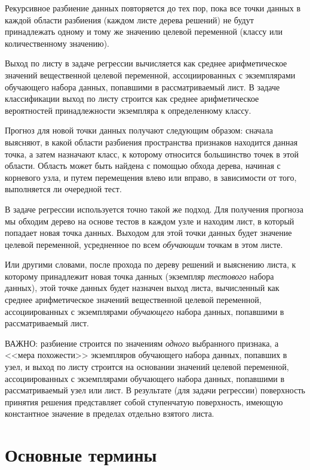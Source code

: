 \documentclass[%
	11pt,
	a4paper,
	utf8,
		]{article}
\begin{document}
Рекурсивное разбиение данных повторяется до тех пор, пока все точки данных в каждой области разбиения (каждом листе дерева решений) не будут принадлежать одному и тому же значению целевой переменной (классу или количественному значению).

Выход по листу в задаче регрессии вычисляется как среднее арифметическое значений вещественной целевой переменной, ассоциированных с экземплярами обучающего набора данных, попавшими в рассматриваемый лист. В задаче классификации выход по листу строится как среднее арифметическое вероятностей принадлежности экземпляра к определенному классу.

Прогноз для новой точки данных получают следующим образом: сначала выясняют, в какой области разбиения пространства признаков находится данная точка, а затем назначают класс, к которому относится большинство точек в этой области. Область может быть найдена с помощью обхода дерева, начиная с корневого узла, и путем перемещения влево или вправо, в зависимости от того, выполняется ли очередной тест.

В задаче регрессии используется точно такой же подход. Для получения прогноза мы обходим дерево на основе тестов в каждом узле и находим лист, в который попадает новая точка данных. Выходом для этой точки данных будет значение целевой переменной, усредненное по всем \emph{обучающим} точкам в этом листе.

Или другими словами, после прохода по дереву решений и выяснению листа, к которому принадлежит новая точка данных (экземпляр \emph{тестового} набора данных), этой точке данных будет назначен выход листа, вычисленный как среднее арифметическое значений вещественной целевой переменной, ассоциированных с экземплярами \emph{обучающего} набора данных, попавшими в рассматриваемый лист.

ВАЖНО: разбиение строится по значениям \emph{одного} выбранного признака, а <<мера похожести>> экземпляров обучающего набора данных, попавших в узел, и выход по листу строится на основании значений целевой переменной, ассоциированных с экземплярами обучающего набора данных, попавшими в рассматриваемый узел или лист. В результате (для задачи регрессии) поверхность принятия решения представляет собой ступенчатую поверхность, имеющую константное значение в пределах отдельно взятого листа.

\section{Основные термины}
\end{document}
